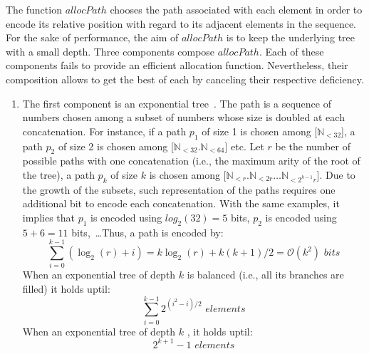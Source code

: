 \begin{asparadesc}
  The function $allocPath$ chooses the path associated with each element in
  order to encode its relative position with regard to its adjacent elements in
  the sequence. For the sake of performance, the aim of $allocPath$ is to keep
  the underlying tree with a small depth. Three components compose
  $allocPath$. Each of these components fails to provide an efficient allocation
  function. Nevertheless, their composition allows to get the best of each by
  canceling their respective deficiency.
  \begin{enumerate}[leftmargin=*]
  \item The first component is an exponential
    tree~\cite{andersson1996faster,andersson2007dynamic}. The path is a sequence
    of numbers chosen among a subset of numbers whose size is doubled at each
    concatenation. For instance, if a path $p_1$ of size 1 is chosen among
    [$\mathbb{N}_{<32}$], a path $p_2$ of size 2 is chosen among
    [$\mathbb{N}_{<32}.\mathbb{N}_{<64}$] etc. Let $r$ be the number of possible
    paths with one concatenation (i.e., the maximum arity of the root of the
    tree), a path $p_k$ of size $k$ is chosen among
    [$\mathbb{N}_{<r}.\mathbb{N}_{<2r}\ldots\mathbb{N}_{<2^{k-1}r}$].  Due to
    the growth of the subsets, such representation of the paths requires one
    additional bit to encode each concatenation. With the same examples, it
    implies that $p_1$ is encoded using $log_2(32)=5$ bits, $p_2$ is encoded
    using $5+6=11$ bits,~\ldots Thus, a path is encoded by:
    \begin{equation}
      \sum\limits_{i=0}^{k-1}(\log_2(r)+i) =
      k\log_2(r) + k(k+1)/2 = \mathcal{O}(k^2) \,\, bits
    \end{equation}
    When an exponential tree of depth $k$ is balanced (i.e., all its branches
    are filled) it holds uptil:
    \begin{equation} \sum\limits_{i=0}^{k-1} {2^{(i^2-i)/2}} \,\, elements
    \end{equation}
    When an exponential tree of depth $k$ , it holds uptil:
    \begin{equation} 2^{k+1}-1  \,\, elements\end{equation}



\end{enumerate}
\end{asparadesc}
